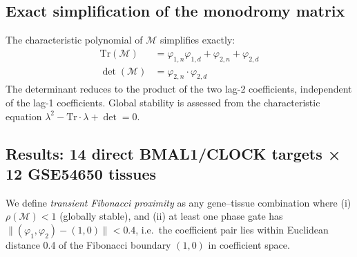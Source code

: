 \documentclass[11pt,letterpaper]{article}
\theoremstyle{definition}
\theoremstyle{remark}
\begin{document}
\subsection{Exact simplification of the monodromy matrix}

The characteristic polynomial of $\mathcal{M}$ simplifies exactly:
\begin{align}
\mathrm{Tr}(\mathcal{M}) &= \varphi_{1,n}\varphi_{1,d} + \varphi_{2,n} + \varphi_{2,d} \\
\det(\mathcal{M}) &= \varphi_{2,n} \cdot \varphi_{2,d}
\end{align}
The determinant reduces to the product of the two lag-2 coefficients, independent of the
lag-1 coefficients. Global stability is assessed from the characteristic equation
$\lambda^2 - \mathrm{Tr}\cdot\lambda + \det = 0$.

\subsection{Results: 14 direct BMAL1/CLOCK targets × 12 GSE54650 tissues}

We define \emph{transient Fibonacci proximity} as any gene--tissue combination where
(i) $\rho(\mathcal{M}) < 1$ (globally stable), and (ii) at least one phase gate has
$\|(\varphi_1,\varphi_2) - (1,0)\| < 0.4$, i.e.\ the coefficient pair lies within
Euclidean distance 0.4 of the Fibonacci boundary $(1,0)$ in coefficient space.
\end{document}

